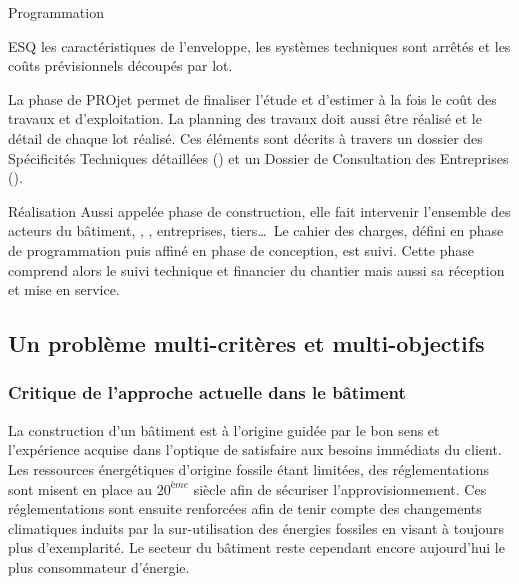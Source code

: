 \begin{blockdescription}{Programmation}
\begin{blockdescription}{ESQ}
                    les caractéristiques de l’enveloppe, les systèmes techniques sont
                    arrêtés et les coûts prévisionnels découpés par lot.
              \item [\abr{PRO}] La phase de PROjet permet de finaliser l’étude et d’estimer
                     à la fois le coût des travaux et d’exploitation. La planning des travaux
                     doit aussi être réalisé et le détail de chaque lot réalisé. Ces éléments
                     sont décrits à travers un dossier des Spécificités Techniques
                     détaillées () et un Dossier de Consultation des Entreprises ().
          \end{blockdescription}
    \item[Réalisation] Aussi appelée phase de construction, elle fait intervenir l’ensemble des acteurs
          du bâtiment, , , entreprises, tiers\dots\ Le cahier des charges, défini
          en phase de programmation puis affiné en phase de conception, est suivi. Cette
          phase comprend alors le suivi technique et financier du chantier mais aussi sa
          réception et mise en service.
\end{blockdescription}



\subsection{Un problème multi-critères et multi-objectifs} %
\label{sub:un_probleme_multi_criteres_et_multi_objectifs}
\subsubsection{Critique de l’approche actuelle dans le bâtiment} %
\label{ssub:critique_de_l_approche_actuelle_dans_le_batiment}
La construction d’un bâtiment est à l’origine guidée par le bon sens et l’expérience
acquise dans l’optique de satisfaire aux besoins immédiats du client.
Les ressources énergétiques d’origine fossile étant limitées, des
réglementations sont misent en place au $20^{ème}$ siècle afin de sécuriser
l’approvisionnement. Ces réglementations sont ensuite renforcées afin de tenir
compte des changements climatiques induits par la sur-utilisation des énergies
fossiles en visant à toujours plus d’exemplarité. Le secteur du bâtiment reste
cependant encore aujourd’hui le plus consommateur d’énergie.

